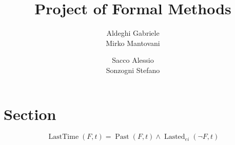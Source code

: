 \documentclass[a4paper]{article}
\title{Project of Formal Methods}
\author{Aldeghi Gabriele \\
  Mirko Mantovani \and
  Sacco Alessio \\
  Sonzogni Stefano}
\DeclareMathOperator{\past}{Past}
\DeclareMathOperator{\lastedOp}{Lasted}
\newcommand{\lasted}{\lastedOp_{ei}}
\DeclareMathOperator{\lasttime}{LastTime}
\begin{document}
\maketitle
\tableofcontents

\section{Section}
\begin{equation*}
\lasttime(F, t) = \past(F, t) \land \lasted(\lnot F, t)
\end{equation*}
\end{document}

